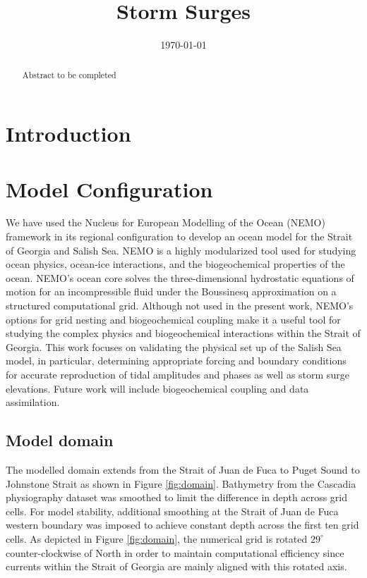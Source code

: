 \documentclass[pdftex,10pt]{article}
\title{Storm Surges}
\date{\today}
\begin{document}
\maketitle

\begin{abstract}
Abstract to be completed
\end{abstract}

\section{Introduction}\label{sec:intro}
\citep{masson2004modelling} %

\section{Model Configuration}\label{sec:config}
We have used the Nucleus for European Modelling of the Ocean (NEMO) framework in its regional configuration to develop an ocean model for the Strait of Georgia and Salish Sea. NEMO is a highly modularized tool used for studying ocean physics, ocean-ice interactions, and the biogeochemical properties of the ocean. NEMO's ocean core solves the three-dimensional hydrostatic equations of motion for an incompressible fluid under the Boussinesq approximation on a structured computational grid. Although not used in the present work, NEMO's options for grid nesting and biogeochemical coupling make it a useful tool for studying the complex physics and biogeochemical interactions within the Strait of Georgia. This work focuses on validating the physical set up of the Salish Sea model, in particular, determining appropriate forcing and boundary conditions for accurate reproduction of tidal amplitudes and phases as well as storm surge elevations. Future work will include biogeochemical coupling and data assimilation. 

\subsection{Model domain}
The modelled domain extends from the Strait of Juan de Fuca to Puget Sound to Johnstone Strait as shown in Figure \ref{fig:domain}. Bathymetry from the Cascadia physiography dataset \citep{haugerud1999digital} was smoothed to limit the difference in depth across grid cells. For model stability, additional smoothing at the Strait of Juan de Fuca western boundary was imposed to achieve constant depth across the first ten grid cells. As depicted in Figure \ref{fig:domain}, the numerical grid is rotated $29^{\circ}$ counter-clockwise of North in order to maintain computational efficiency since currents within the Strait of Georgia are mainly aligned with this rotated axis. 
\end{document}
